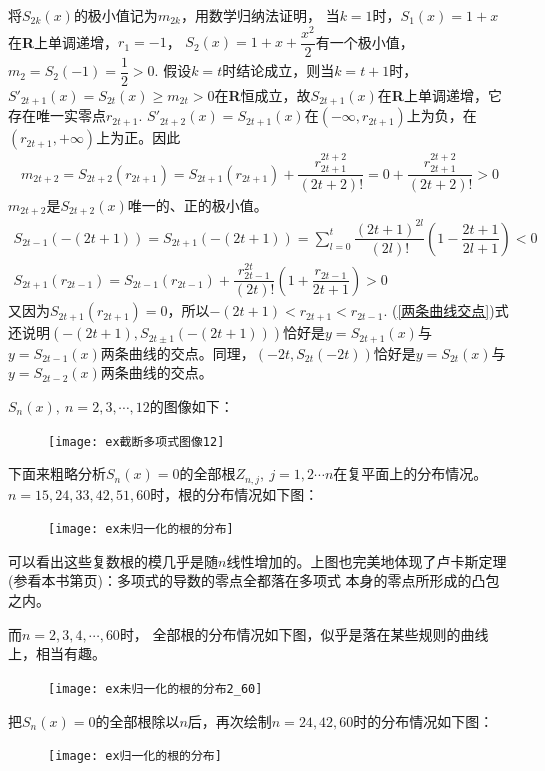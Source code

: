 \begin{enumerate}[label={【\textbf{例\thechapter.\arabic*}】},
 leftmargin=\inteval{\myenumleftmargin}pt,
 itemsep=\inteval{\myenumitempsep}pt,
 itemindent=\inteval{\myenumitemindent}pt]
将$S_{2k}(x)$的极小值记为$ m_{2k} $，用数学归纳法证明，
当$ k=1 $时，$ S_1(x)=1+x $在\textbf{R}上单调递增，$ r_1=-1 $， $ S_2(x)=1+x+\dfrac{x^2}{2} $有一个极小值，$ m_2=S_2(-1)=\dfrac{1}{2}>0 $. 假设$ k=t $时结论成立，则当$ k=t+1 $时，$ S'_{2t+1}(x)=S_{2t}(x)\geq m_{2t}>0 $在\textbf{R}恒成立，故$ S_{2t+1}(x) $在\textbf{R}上单调递增，它存在唯一实零点$ r_{2t+1}$. $ S'_{2t+2}(x)=S_{2t+1}(x) $在$(-\infty,r_{2t+1}) $上为负，在$(r_{2t+1},+\infty) $上为正。因此
\begin{align*}
    m_{2t+2}=S_{2t+2}(r_{2t+1})=S_{2t+1}(r_{2t+1})+\dfrac{r_{2t+1}^{2t+2}}{(2t+2)!}=0+\dfrac{r_{2t+1}^{2t+2}}{(2t+2)!}>0
\end{align*}
$ m_{2t+2} $是$ S_{2t+2}(x) $唯一的、正的极小值。
\begin{gather}
    S_{2t-1}(-(2t+1))=S_{2t+1}(-(2t+1))=\sum_{l=0}^{t}\dfrac{{(2t+1)}^{2l}}{(2l)!}\left( 1-\dfrac{2t+1}{2l+1} \right) <0  \label{两条曲线交点} \\
    S_{2t+1}(r_{2t-1})=S_{2t-1}(r_{2t-1})+\dfrac{r_{2t-1}^{2t}}{(2t)!} \left( 1+\dfrac{r_{2t-1}}{2t+1}\right)>0
\end{gather}
又因为$ S_{2t+1}(r_{2t+1})=0 $，所以$ -(2t+1)<r_{2t+1}<r_{2t-1} $.
(\ref{两条曲线交点})式还说明$ (-(2t+1),S_{2t\pm 1}(-(2t+1))) $恰好是$ y=S_{2t+1}(x) $与$ y=S_{2t-1}(x) $两条曲线的交点。同理，$ (-2t,S_{2t}(-2t)) $恰好是$ y=S_{2t}(x) $与$ y=S_{2t-2}(x) $两条曲线的交点。 

$ S_n(x),\ n=2,3,\cdots, 12 $的图像如下：
\begin{figure}[h]
    \centering
    \texttt{[image: ex截断多项式图像12]}
\end{figure} 

下面来粗略分析$ S_n(x)=0 $的全部根$ Z_{n,j},\ j=1,2 \cdots n $在复平面上的分布情况。
$ n=15,24,33,42,51,60 $时，根的分布情况如下图：
\begin{figure}[h]
    \centering
    \texttt{[image: ex未归一化的根的分布]}
\end{figure} 

可以看出这些复数根的模几乎是随$ n $线性增加的。上图也完美地体现了卢卡斯定理
(参看本书第\pageref{Lucas定理-凸包}页)：多项式的导数的零点全都落在多项式
本身的零点所形成的凸包之内。

而$ n=2,3,4,\cdots,60 $时，
全部根的分布情况如下图，似乎是落在某些规则的曲线上，相当有趣。
\begin{figure}[h]
    \centering
    \texttt{[image: ex未归一化的根的分布2\_60]}
\end{figure} 

把$ S_n(x)=0 $的全部根除以$ n $后，再次绘制$ n=24,42,60 $时的分布情况如下图：
\begin{figure}[h]
    \centering
    \texttt{[image: ex归一化的根的分布]}
\end{figure} 


\end{enumerate}
